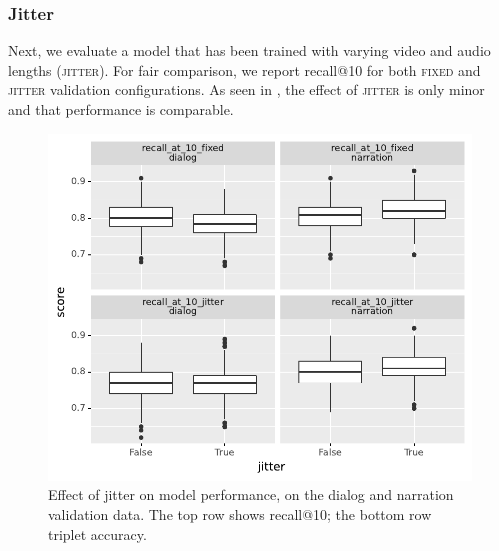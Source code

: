 \subsubsection{Jitter}
Next, we evaluate a model that has been trained with varying video and audio 
lengths (\textsc{jitter}). For fair comparison, we report recall@10 for both 
\textsc{fixed} and \textsc{jitter} validation configurations.
As seen in , the effect of \textsc{jitter} is only
minor and that performance is comparable. 
\begin{figure}[htb]
	\centering
	\includegraphics[width=\columnwidth]{results/ablations/jitter.pdf}
	\caption{Effect of jitter on model performance, on the dialog
          and narration validation data. The top row shows recall@10;
          the bottom row triplet accuracy.}
	\label{fig:jitter}
\end{figure}



